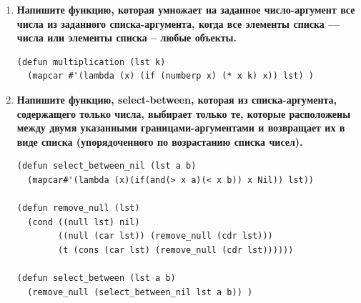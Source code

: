 \documentclass[a4paper,14pt]{extreport} %
\begin{document}
\begin{enumerate}
\item \textbf{Напишите функцию, которая умножает на заданное число-аргумент все числа
из заданного списка-аргумента, когда все элементы списка --- числа или элементы списка -- любые объекты.}

\begin{lstlisting}
(defun multiplication (lst k)
  (mapcar #'(lambda (x) (if (numberp x) (* x k) x)) lst) )
\end{lstlisting}

\item \textbf{Напишите функцию, select-between, которая из списка-аргумента,
содержащего только числа, выбирает только те, которые расположены между двумя указанными границами-аргументами и возвращает их в виде списка (упорядоченного по возрастанию списка чисел).}

\begin{lstlisting}
(defun select_between_nil (lst a b)
  (mapcar#'(lambda (x)(if(and(> x a)(< x b)) x Nil)) lst))

(defun remove_null (lst)
  (cond ((null lst) nil)
        ((null (car lst)) (remove_null (cdr lst)))
        (t (cons (car lst) (remove_null (cdr lst))))))

(defun select_between (lst a b)
  (remove_null (select_between_nil lst a b)) )
\end{lstlisting}

\end{enumerate}
\end{document}
